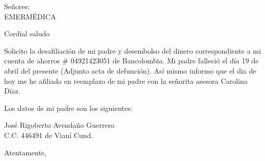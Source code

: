 \documentclass[letterpaper,spanish]{letter}
\begin{document}
\begin{letter}{Señores:\\EMERMÉDICA}
	
\opening{Cordial saludo}
Solicito la desafiliación de mi padre y desembolso del dinero correspondiente a mi cuenta de ahorros \# 04921423051 de Bancolombia. Mi padre falleció el día 19 de abril del presente (Adjunto acta de defunción). Así mismo informo que el dia de hoy me he afiliado en reemplazo de mi padre con la señorita asesora Carolina Díaz.

Los datos de mi padre son los siguientes:

José Rigoberto Avendaño Guerrero\\
C.C. 446491 de Vianí Cund.\\
\closing{Atentamente,}


\end{letter}
\end{document}
